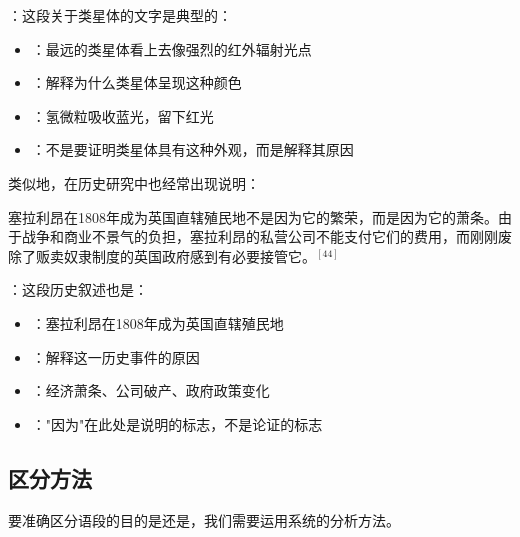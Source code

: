 \begin{examplebox}[title=科学说明实例分析]
：这段关于类星体的文字是典型的：
\begin{itemize}
  \item {}：最远的类星体看上去像强烈的红外辐射光点
  \item {}：解释为什么类星体呈现这种颜色
  \item {}：氢微粒吸收蓝光，留下红光
  \item {}：不是要证明类星体具有这种外观，而是解释其原因
\end{itemize}
\end{examplebox}

类似地，在历史研究中也经常出现说明：

\begin{displayquote}
塞拉利昂在1808年成为英国直辖殖民地不是因为它的繁荣，而是因为它的萧条。由于战争和商业不景气的负担，塞拉利昂的私营公司不能支付它们的费用，而刚刚废除了贩卖奴隶制度的英国政府感到有必要接管它。$^{[44]}$
\end{displayquote}

\begin{examplebox}[title=历史说明实例分析]
：这段历史叙述也是：
\begin{itemize}
  \item {}：塞拉利昂在1808年成为英国直辖殖民地
  \item {}：解释这一历史事件的原因
  \item {}：经济萧条、公司破产、政府政策变化
  \item {}："因为"在此处是说明的标志，不是论证的标志
\end{itemize}
\end{examplebox}

\subsection{区分方法}

要准确区分语段的目的是还是，我们需要运用系统的分析方法。

